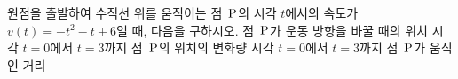 원점을 출발하여 수직선 위를 움직이는 점~$\mathrm{P}$의 시각 $t$에서의 속도가 $v(t)=-t^2-t+6$일 때, 다음을 구하시오.
 점~$\mathrm{P}$가 운동 방향을 바꿀 때의 위치
 시각 $t=0$에서 $t=3$까지 점~$\mathrm{P}$의 위치의 변화량
 시각 $t=0$에서 $t=3$까지 점~$\mathrm{P}$가 움직인 거리

